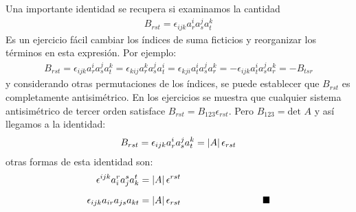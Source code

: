\documentclass[hidelinks,12pt]{article}
\renewcommand{\qed}{\hfill\blacksquare}
\begin{document}
\par
Una importante identidad se recupera si examinamos la cantidad 
\begin{align*}
B_{rst} = \epsilon_{ijk} a_{r}^{i} a_{s}^{j} a_{t}^{k}
\end{align*}
Es un ejercicio fácil cambiar los índices de suma ficticios y reorganizar los términos en esta expresión. Por ejemplo:
\begin{align*}
B_{rst} = \epsilon_{ijk} a_{r}^{i} a_{s}^{j} a_{t}^{k} = \epsilon_{kij} a_{r}^{k} a_{s}^{j} a_{t}^{i} = \epsilon_{kji} a_{t}^{i} a_{s}^{j} a_{r}^{k} = - \epsilon_{ijk} a_{t}^{i} a_{s}^{j} a_{r}^{k} = - B_{tsr}
\end{align*}
y considerando otras permutaciones de los índices, se puede establecer que $B_{rst}$ es completamente antisimétrico. En los ejercicios se muestra que cualquier sistema antisimétrico de tercer orden satisface
$B_{rst} = B_{123} \epsilon_{rst}$. Pero $B_{123} = \text{det } A$ y así llegamos a la identidad:
\begin{align*}
B_{rst} = \epsilon_{ijk} a_{r}^{i} a_{s}^{j} a_{t}^{k} = \abs{A} \, \epsilon_{rst}
\end{align*}
otras formas de esta identidad son:
\begin{align}
\begin{aligned}
\epsilon^{ijk} a_{i}^{r} a_{j}^{s} a_{k}^{t} &= \abs{A} \, \epsilon^{rst} \\[0.5em]
\epsilon_{ijk} a_{ir} a_{js} a_{kt} &= \abs{A} \, \epsilon_{rst} \hspace{3cm} \qed
\end{aligned}
\label{eq:ecuacion_01_01_19} 
\end{align}
\end{document}
